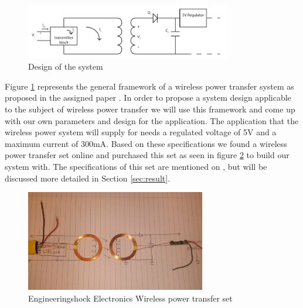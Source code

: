 \begin{figure}[h!]
\centering
\includegraphics[width=0.8\textwidth]{design.pdf}
\caption{Design of the system}
\label{fig:design1}
\end{figure}

Figure \ref{fig:design1} represents the general framework of a wireless power transfer system as proposed in the assigned paper \cite{paper}. In order to propose a system design applicable to the subject of wireless power transfer we will use this framework and come up with our own parameters and design for the application. The application that the wireless power system will supply for needs a regulated voltage of 5V and a maximum current of 300mA. Based on these specifications we found a wireless power transfer set online \cite{wireless} and purchased this set as seen in figure \ref{fig:set} to build our system with. The specifications of this set are mentioned on \cite{wireless}, but will be discussed more detailed in Section \ref{sec:result}. 

\begin{figure}[h!]
\centering
\includegraphics[width=0.7\textwidth]{wirelessset.jpg}
\caption{Engineeringshock Electronics Wireless power transfer set}
\label{fig:set}
\end{figure}